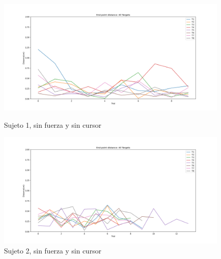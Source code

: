 \documentclass[a4paper,11pt, oneside]{book}
\begin{document}
\begin{figure}[H]
	\begin{minipage}[b]{0.5\linewidth}
		\centering
		\includegraphics[width=\linewidth]{sujeto1/no_force_no_cursor/evolution_distance}
		\caption{Sujeto 1, sin fuerza y sin cursor}
		\label{fig:figura1}
	\end{minipage}
	\hspace{0.5cm}
	\begin{minipage}[b]{0.5\linewidth}
		\centering
		\includegraphics[width=\linewidth]{sujeto2/no_force_no_cursor/evolution_distance}
		\caption{Sujeto 2, sin fuerza y sin cursor}
		\label{fig:figura2}
	\end{minipage}
\end{figure}
\end{document}
